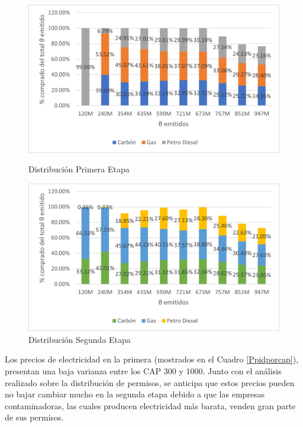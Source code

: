 \begin{figure}[H]
  \centering
  \begin{minipage}[b]{0.49\textwidth}
    \includegraphics[width=\textwidth]{docs/DocumentoMemoria/core/images/distr primera etapa precision.png}
    \caption{{\footnotesize Distribución Primera Etapa}}
    \label{distriMP1}
  \end{minipage}
  \hfill
  \begin{minipage}[b]{0.49\textwidth}
    \includegraphics[width=\textwidth]{docs/DocumentoMemoria/core/images/distr segunda etapa precision.png}
    \caption{{\footnotesize Distribución Segunda Etapa}}
     \label{distriMP3}
  \end{minipage}
\end{figure}

Los precios de electricidad en la primera (mostrados en el Cuadro \ref{Ppidporcap}), presentan una baja varianza entre los CAP 300 y 1000. Junto con el análisis realizado sobre la distribución de permisos, se anticipa que estos precios pueden no bajar cambiar mucho en la segunda etapa debido a que las empresas contaminadoras, las cuales producen electricidad más barata, venden gran parte de sus permisos.
\vspace{2.5mm}


